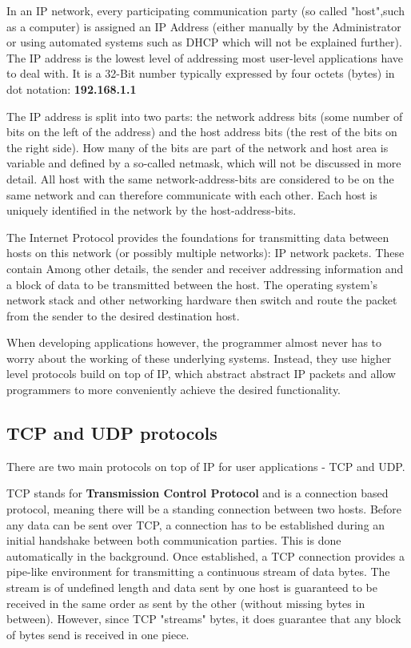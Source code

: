 \documentclass[conference]{IEEEtran}
\begin{document}
In an IP network, every participating communication party (so called "host",such as a computer) is assigned an IP Address (either manually by the Administrator or using automated systems such as DHCP which will not be explained further). The IP address is the lowest level of addressing most user-level applications have to deal with. It is a 32-Bit number typically expressed by four octets (bytes) in dot notation: \textbf{192.168.1.1}

The IP address is split into two parts: the network address bits (some number of bits on the left of the address) and the host address bits (the rest of the bits on the right side). How many of the bits are part of the network and host area is variable and defined by a so-called netmask, which will not be discussed in more detail. All host with the same network-address-bits are considered to be on the same network and can therefore communicate with each other. Each host is uniquely identified in the network by the host-address-bits.

The Internet Protocol provides the foundations for transmitting data between hosts on this network (or possibly multiple networks): IP network packets. These contain Among other details, the sender and receiver addressing information and a block of data to be transmitted between the host. The operating system's network stack and other networking hardware then switch and route the packet from the sender to the desired destination host.

When  developing applications however, the programmer almost never has to worry about the working of these underlying systems. Instead, they use higher level protocols build on top of IP, which abstract abstract IP packets and allow programmers to more conveniently achieve the desired functionality.

\subsection{TCP and UDP protocols}

There are two main protocols on top of IP for user applications - TCP and UDP. 

TCP stands for \textbf{Transmission Control Protocol} and is a connection based protocol, meaning there will be a standing connection between two hosts. Before any data can be sent over TCP, a connection has to be established during an initial handshake between both communication parties. This is done automatically in the background. Once established, a TCP connection provides a pipe-like environment for transmitting a continuous stream of data bytes. The stream is of undefined length and data sent by one host is guaranteed to be received in the same order as sent by the other (without missing bytes in between). However, since TCP "streams" bytes, it does guarantee that any block of bytes send is received in one piece.
\end{document}
